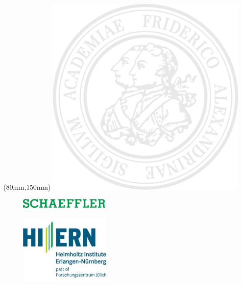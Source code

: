 \thispagestyle{empty}

\begin{addmargin}[-3cm]{-5cm}
	\begin{center}

		\begin{textblock*}{14cm}(80mm,150mm)
			\includegraphics[width=100mm]{gfx/essential/fausiegel.pdf}
		\end{textblock*}

		\begin{figure}[t]
		    \begin{minipage}[]{.49\textwidth}
		        \flushleft
		        \includegraphics[width=4.5cm]{gfx/essential/schaeffler.png}\\
		    \end{minipage}
		    \begin{minipage}[]{.49\textwidth}
		        \flushright
		        \includegraphics[width=4.5cm]{gfx/essential/HIERN.jpg}\\
		    \end{minipage}
		\end{figure}


\end{center}
\end{addmargin}
